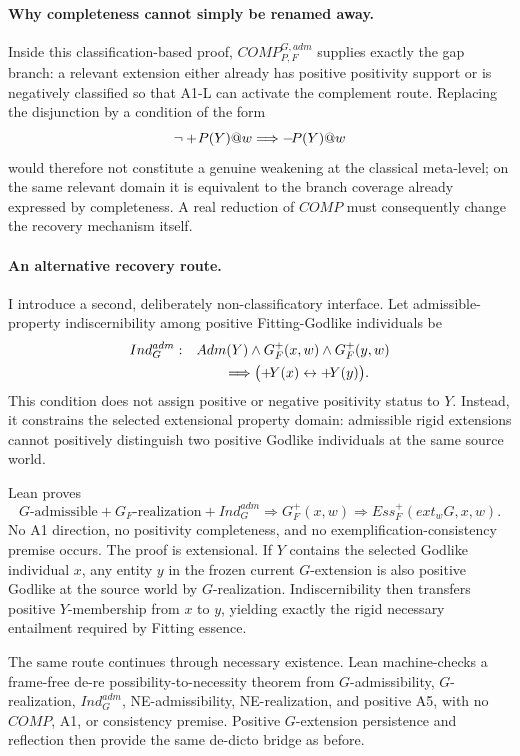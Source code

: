 \paragraph{Why completeness cannot simply be renamed away.}
Inside this classification-based proof, \(COMP_{P,F}^{G,adm}\) supplies exactly the gap branch: a relevant extension either already has positive positivity support or is negatively classified so that A1-L can activate the complement route. Replacing the disjunction by a condition of the form
\[
  \neg+\!P(Y)@w\Longrightarrow-\!P(Y)@w
\]
would therefore not constitute a genuine weakening at the classical meta-level; on the same relevant domain it is equivalent to the branch coverage already expressed by completeness. A real reduction of \(COMP\) must consequently change the recovery mechanism itself.

\paragraph{An alternative recovery route.}
I introduce a second, deliberately non-classificatory interface. Let admissible-property indiscernibility among positive Fitting-Godlike individuals be
\[
\begin{split}
  Ind_G^{adm}:\quad
  &Adm(Y)\land G_F^+(x,w)\land G_F^+(y,w)\\
  &\qquad\Longrightarrow
  \bigl(+\!Y(x)\leftrightarrow+\!Y(y)\bigr).
\end{split}
\]
This condition does not assign positive or negative positivity status to \(Y\). Instead, it constrains the selected extensional property domain: admissible rigid extensions cannot positively distinguish two positive Godlike individuals at the same source world.

Lean proves
\[
\boxed{
G\text{-admissible}
+G_F\text{-realization}
+Ind_G^{adm}
\Longrightarrow
G_F^+(x,w)\Rightarrow Ess_F^+(ext_wG,x,w).
}
\]
No A1 direction, no positivity completeness, and no exemplification-consistency premise occurs. The proof is extensional. If \(Y\) contains the selected Godlike individual \(x\), any entity \(y\) in the frozen current \(G\)-extension is also positive Godlike at the source world by \(G\)-realization. Indiscernibility then transfers positive \(Y\)-membership from \(x\) to \(y\), yielding exactly the rigid necessary entailment required by Fitting essence.

The same route continues through necessary existence. Lean machine-checks a frame-free de-re possibility-to-necessity theorem from \(G\)-admissibility, \(G\)-realization, \(Ind_G^{adm}\), NE-admissibility, NE-realization, and positive A5, with no \(COMP\), A1, or consistency premise. Positive \(G\)-extension persistence and reflection then provide the same de-dicto bridge as before.

